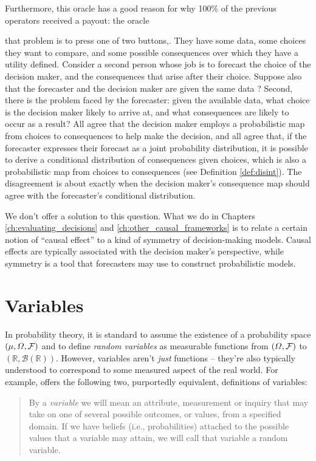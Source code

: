  Furthermore, this oracle has a good reason for why 100\% of the previous operators received a payout: the oracle 

  that problem is to press one of two buttons,. They have some data, some choices they want to compare, and some possible consequences over which they have a utility defined. Consider a second person whose job is to forecast the choice of the decision maker, and the consequences that arise after their choice. Suppose also that the forecaster and the decision maker are given the same data ? Second, there is the problem faced by the forecaster: given the available data, what choice is the decision maker likely to arrive at, and what consequences are likely to occur as a result? All agree that the decision maker employs a probabilistic map from choices to consequences to help make the decision, and all agree that, if the forecaster expresses their forecast as a joint probability distribution, it is possible to derive a conditional distribution of consequences given choices, which is also a probabilistic map from choices to consequences (see Definition \ref{def:disint}). The disagreement is about exactly when the decision maker's consequence map should agree with the forecaster's conditional distribution.

We don't offer a solution to this question. What we do in Chapters \ref{ch:evaluating_decisions} and \ref{ch:other_causal_frameworks} is to relate a certain notion of ``causal effect'' to a kind of symmetry of decision-making models. Causal effects are typically associated with the decision maker's perspective, while symmetry is a tool that forecasters may use to construct probabilistic models. 

\section{Variables}\label{sec:variable}

In probability theory, it is standard to assume the existence of a probability space $(\mu,\Omega,\mathcal{F})$ and to define \emph{random variables} as measurable functions from $(\Omega,\mathcal{F})$ to $(\mathbb{R},\mathcal{B}(\mathbb{R}))$. However, variables aren't \emph{just} functions -- they're also typically understood to correspond to some measured aspect of the real world. For example, \citet{pearl_causality:_2009} offers the following two, purportedly equivalent, definitions of variables:
\begin{quote}
By a \emph{variable} we will mean an attribute, measurement or inquiry that may take on one of several possible outcomes, or values, from a specified domain. If we have beliefs (i.e., probabilities) attached to the possible values that a variable may attain, we will call that variable a random variable.
\end{quote}

